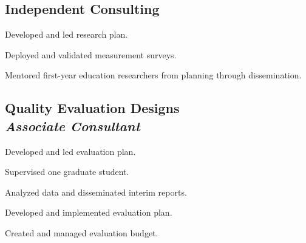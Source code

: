 
\subsection{\textbf{Independent Consulting}}
\begin{cvtable}
        {\color{cvsectioncolor}{Entrepreneurial Mindset and Cultural Wealth in Engineering}}
        {}
        {\begin{tightitemize}
            \item Developed and led research plan.
            \item Deployed and validated measurement surveys.
            \item Mentored first-year education researchers from planning through dissemination.
        \end{tightitemize}}
\end{cvtable}

\subsection{\textbf{Quality Evaluation Designs} 
\\\textit{Associate Consultant}}
\begin{cvtable}
        {\color{cvsectioncolor}{Advocacy Building Campaign for Engineering Education Research}}
        {}
        {\begin{tightitemize}
            \item Developed and led evaluation plan.
            \item Supervised one graduate student.
            \item Analyzed data and disseminated interim reports.
        \end{tightitemize}}
        {\color{cvsectioncolor}{Peer Review as an Inclusive Mentoring Experience}}
        {}
        {\begin{tightitemize}
            \item Developed and implemented evaluation plan.
            \item Created and managed evaluation budget.
        \end{tightitemize}}
\end{cvtable}

